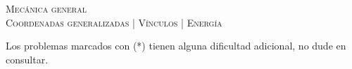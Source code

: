 \documentclass[11pt,spanish,a4paper]{article}
\begin{document}
\begin{center}
  \textsc{\large Mecánica general}\\
  \textsc{\large Coordenadas generalizadas | Vínculos | Energía}
\end{center}

\noindent
Los problemas marcados con (*) tienen alguna dificultad adicional, no dude en consultar.
\begin{enumerate}







\end{enumerate}
\end{document}
